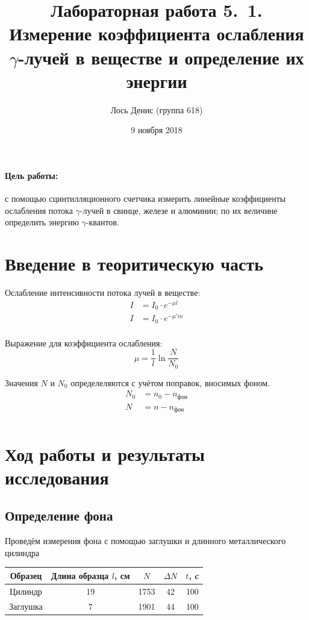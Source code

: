 \documentclass[12pt]{article}
\title{{\bf Лабораторная работа 5.\, 1. \\ Измерение коэффициента ослабления $\gamma$-лучей в веществе и определение их энергии}}
\author{Лось Денис (группа 618)}
\date{9 ноября 2018}
\begin{document}
\maketitle

\paragraph*{Цель работы: } с помощью сцинтилляционного счетчика измерить линейные коэффициенты ослабления потока $\gamma$-лучей в свинце, железе и алюминии; по их величине определить энергию $\gamma$-квантов.

\section*{Введение в теоритическую часть}
\par
	Ослабление интенсивности потока лучей в веществе:
\begin{align*}
	I &= I_0 \cdot e^{-\mu l} \\
	I &= I_0 \cdot e^{-\mu' m} \\
\end{align*}
\par
	Выражение для коэффициента ослабления:
\[
	\mu = \frac{1}{l} \ln \frac{N}{N_0}
\]
\par
	Значения $N$ и $N_0$ определеляются с учётом поправок, вносимых фоном.
\begin{align*}
	N_0 &= n_0 - n_\text{фон} \\
	N &= n - n_\text{фон} \\
\end{align*}

\section*{Ход работы и результаты исследования}
\subsection*{Определение фона}
\par
	Проведём измерения фона с помощью заглушки и длинного металлического цилиндра

\begin{table}[h!]
	\centering
	\begin{tabular}{|c|c|c|c|c|}
	\hline
		Образец & Длина образца $l$, см & $N$ & $\Delta N$ & $t$, c \\
	\hline
		Цилиндр & 19 & 1753 & 42 & 100 \\
	\hline
		Заглушка & 7 & 1901 & 44 & 100 \\ 
	\hline
	\end{tabular}
\end{table}
\end{document}

